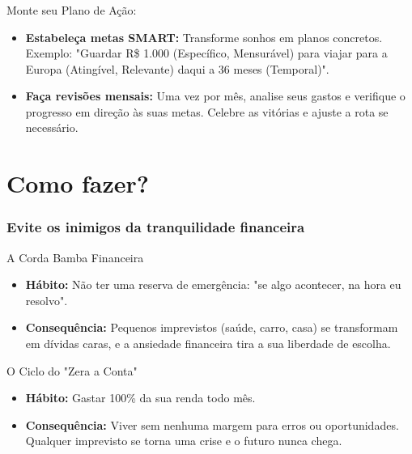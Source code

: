 \begin{frame}[c]\frametitle{}
  \begin{block}{\Large \textcolor{green}{}\quad Monte seu Plano de Ação:}

    \vspace{0.7cm}

    \begin{itemize}
      \item \textbf{Estabeleça metas SMART:} Transforme sonhos em planos concretos. Exemplo: "Guardar R\$ 1.000 (Específico, Mensurável) para viajar para a Europa (Atingível, Relevante) daqui a  36 meses (Temporal)".
      \item \textbf{Faça revisões mensais:} Uma vez por mês, analise seus gastos e verifique o progresso em direção às suas metas. Celebre as vitórias e ajuste a rota se necessário.
    \end{itemize}
  \end{block}
\end{frame}

\section{Como fazer?}

\begin{frame}[t]
  \frametitle{Evite os inimigos da tranquilidade financeira}


  \begin{block}{\large \color{purple}\quad A Corda Bamba Financeira}
    \begin{itemize}
      \item \textbf{Hábito:} Não ter uma reserva de emergência: "se algo acontecer, na hora eu resolvo".
      \item \textbf{Consequência:}  Pequenos imprevistos (saúde, carro, casa) se transformam em dívidas caras, e a ansiedade financeira tira a sua liberdade de escolha.
    \end{itemize}
  \end{block}

  \vspace{1cm}\pause

  \begin{block}{\large \color{orange}\quad O Ciclo do "Zera a Conta"}
    \begin{itemize}
      \item \textbf{Hábito:} Gastar 100\% da sua renda todo mês.
      \item \textbf{Consequência:} Viver sem nenhuma margem para erros ou oportunidades. Qualquer imprevisto se torna uma crise e o futuro nunca chega.
    \end{itemize}
  \end{block}
\end{frame}

